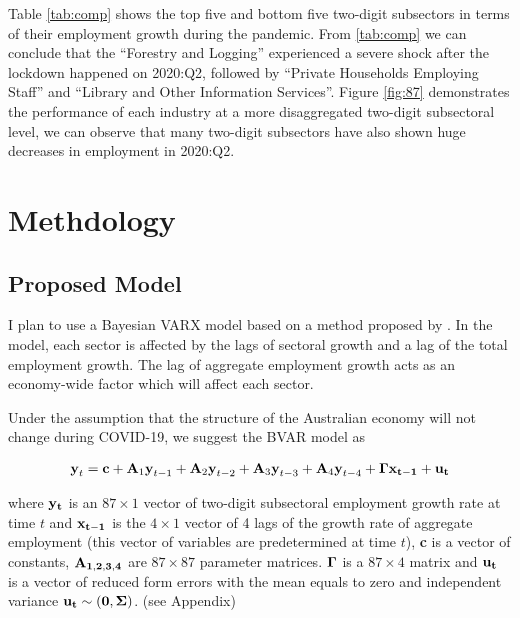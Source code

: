 \documentclass{monashthesis}
\begin{document}
Table \ref{tab:comp} shows the top five and bottom five two-digit subsectors in terms of their employment growth during the pandemic. From \ref{tab:comp} we can conclude that the ``Forestry and Logging'' experienced a severe shock after the lockdown happened on 2020:Q2, followed by ``Private Households Employing Staff'' and ``Library and Other Information Services''. Figure \ref{fig:87} demonstrates the performance of each industry at a more disaggregated two-digit subsectoral level, we can observe that many two-digit subsectors have also shown huge decreases in employment in 2020:Q2.

\hypertarget{methdology}{%
\chapter{Methdology}\label{methdology}}

\hypertarget{proposed-model}{%
\section{Proposed Model}\label{proposed-model}}

I plan to use a Bayesian VARX model based on a method proposed by \textcite{anderson2020}. In the model, each sector is affected by the lags of sectoral growth and a lag of the total employment growth. The lag of aggregate employment growth acts as an economy-wide factor which will affect each sector.

Under the assumption that the structure of the Australian economy will not change during COVID-19, we suggest the BVAR model as

\[
\begin{aligned}
\textbf{y}_t=\textbf{c}+\textbf{A}_1 \textbf{y}_{t-1}+\textbf{A}_2\textbf{y}_{t-2}+\textbf{A}_3\textbf{y}_{t-3}+\textbf{A}_4\textbf{y}_{t-4}+\bf{\Gamma}\textbf{x}_{t-1}+\bf{u}_t
\end{aligned}
\]

where \(\bf{y}_t\) is an \(87\times1\) vector of two-digit subsectoral employment growth rate at time \(t\) and \(\bf{x}_{t-1}\) is the \(4\times1\) vector of 4 lags of the growth rate of aggregate employment (this vector of variables are predetermined at time \(t\)), \textbf{c} is a vector of constants, \(\bf{A}_{1,2,3,4}\) are \(87\times87\) parameter matrices. \(\bf{\Gamma}\) is a \(87\times4\) matrix and \(\bf{u}_t\) is a vector of reduced form errors with the mean equals to zero and independent variance \(\bf{u}_t \sim (0,\bf{\Sigma})\). (see Appendix)
\end{document}
